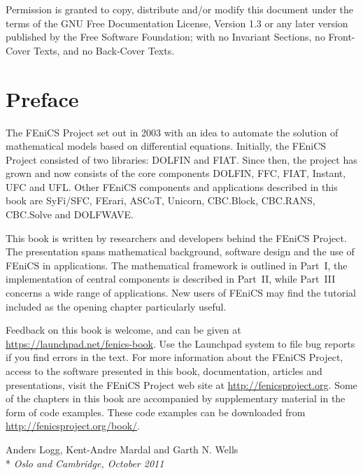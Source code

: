 \noindent
{\footnotesize
Permission is granted to copy, distribute and/or modify this document
under the terms of the GNU Free Documentation License, Version 1.3 or
any later version published by the Free Software Foundation; with no
Invariant Sections, no Front-Cover Texts, and no Back-Cover Texts.

\tableofcontents

\chapter*{Preface}

\thispagestyle{empty}

The FEniCS Project set out in 2003 with an idea to automate the
solution of mathematical models based on differential equations.
Initially, the FEniCS Project consisted of two libraries: DOLFIN and
FIAT. Since then, the project has grown and now consists of the core
components DOLFIN, FFC, FIAT, Instant, UFC and UFL. Other FEniCS
components and applications described in this book are SyFi/SFC,
FErari, ASCoT, Unicorn, CBC.Block, CBC.RANS, CBC.Solve and DOLFWAVE.

This book is written by researchers and developers behind the FEniCS
Project. The presentation spans mathematical background, software
design and the use of FEniCS in applications. The mathematical
framework is outlined in Part~I, the implementation of central
components is described in Part~II, while Part~III concerns a wide
range of applications. New users of FEniCS may find the tutorial
included as the opening chapter particularly useful.

Feedback on this book is welcome, and can be given at
\url{https://launchpad.net/fenics-book}. Use the Launchpad system to
file bug reports if you find errors in the text. For more information
about the FEniCS Project, access to the software presented in this
book, documentation, articles and presentations, visit the FEniCS
Project web site at \url{http://fenicsproject.org}. Some of the
chapters in this book are accompanied by supplementary material in the
form of code examples. These code examples can be downloaded from
\url{http://fenicsproject.org/book/}.

\vspace{1em}

\noindent
Anders Logg, Kent-Andre Mardal and Garth N. Wells \\*
\emph{Oslo and Cambridge, October 2011}

}
